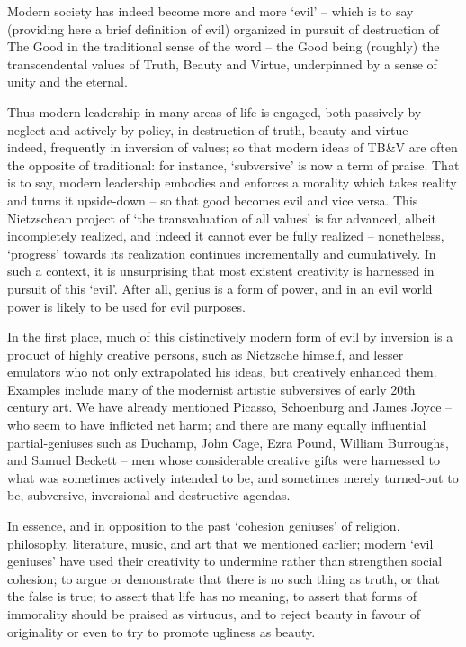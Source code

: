 \documentclass[
]{book}
\begin{document}
Modern society has indeed become more and more `evil' -- which is to say (providing here a brief definition of evil) organized in pursuit of destruction of The Good in the traditional sense of the word -- the Good being (roughly) the transcendental values of Truth, Beauty and Virtue, underpinned by a sense of unity and the eternal.

Thus modern leadership in many areas of life is engaged, both passively by neglect and actively by policy, in destruction of truth, beauty and virtue -- indeed, frequently in inversion of values; so that modern ideas of TB\&V are often the opposite of traditional: for instance, `subversive' is now a term of praise. That is to say, modern leadership embodies and enforces a morality which takes reality and turns it upside-down -- so that good becomes evil and vice versa. This Nietzschean project of `the transvaluation of all values' is far advanced, albeit incompletely realized, and indeed it cannot ever be fully realized -- nonetheless, `progress' towards its realization continues incrementally and cumulatively. In such a context, it is unsurprising that most existent creativity is harnessed in pursuit of this `evil'. After all, genius is a form of power, and in an evil world power is likely to be used for evil purposes.

In the first place, much of this distinctively modern form of evil by inversion is a product of highly creative persons, such as Nietzsche himself, and lesser emulators who not only extrapolated his ideas, but creatively enhanced them. Examples include many of the modernist artistic subversives of early 20th century art. We have already mentioned Picasso, Schoenburg and James Joyce -- who seem to have inflicted net harm; and there are many equally influential partial-geniuses such as Duchamp, John Cage, Ezra Pound, William Burroughs, and Samuel Beckett -- men whose considerable creative gifts were harnessed to what was sometimes actively intended to be, and sometimes merely turned-out to be, subversive, inversional and destructive agendas.

In essence, and in opposition to the past `cohesion geniuses' of religion, philosophy, literature, music, and art that we mentioned earlier; modern `evil geniuses' have used their creativity to undermine rather than strengthen social cohesion; to argue or demonstrate that there is no such thing as truth, or that the false is true; to assert that life has no meaning, to assert that forms of immorality should be praised as virtuous, and to reject beauty in favour of originality or even to try to promote ugliness as beauty.
\end{document}
